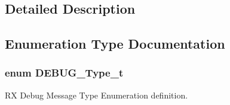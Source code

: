 \subsection{Detailed Description}


\subsection{Enumeration Type Documentation}
\subsubsection[{\texorpdfstring{D\+E\+B\+U\+G\+\_\+\+Type\+\_\+t}{DEBUG_Type_t}}]{\setlength{\rightskip}{0pt plus 5cm}enum {\bf D\+E\+B\+U\+G\+\_\+\+Type\+\_\+t}}\hypertarget{group___debug___exported___types_gacb1775677105967978fae4d9155cca26}{}\label{group___debug___exported___types_gacb1775677105967978fae4d9155cca26}


RX Debug Message Type Enumeration definition. 

